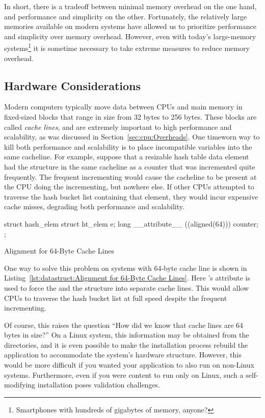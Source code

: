 In short, there is a tradeoff between minimal memory overhead on
the one hand, and performance and simplicity on the other.
Fortunately, the relatively large memories available on modern
systems have allowed us to prioritize performance and simplicity
over memory overhead.
However, even with today's large-memory systems\footnote{
	Smartphones with hundreds of gigabytes of memory, anyone?}
it is sometime necessary to take extreme measures to reduce
memory overhead.

\subsection{Hardware Considerations}
\label{sec:datastruct:Hardware Considerations}

Modern computers typically move data between CPUs and main memory in
fixed-sized blocks that range in size from 32 bytes to 256 bytes.
These blocks are called \emph{cache lines}, and are extremely important
to high performance and scalability, as was discussed in
Section~\ref{sec:cpu:Overheads}.
One timeworn way to kill both performance and scalability is to
place incompatible variables into the same cacheline.
For example, suppose that a resizable hash table data element had
the  structure in the same cacheline as a counter that
was incremented quite frequently.
The frequent incrementing would cause the cacheline to be present at
the CPU doing the incrementing, but nowhere else.
If other CPUs attempted to traverse the hash bucket list containing
that element, they would incur expensive cache misses, degrading both
performance and scalability.

\begin{listing}[tb]
\begin{VerbatimL}
struct hash_elem {
	struct ht_elem e;
	long __attribute__ ((aligned(64))) counter;
};
\end{VerbatimL}
\caption{Alignment for 64-Byte Cache Lines}
\label{lst:datastruct:Alignment for 64-Byte Cache Lines}
\end{listing}

One way to solve this problem on systems with 64-byte cache line is shown in
Listing~\ref{lst:datastruct:Alignment for 64-Byte Cache Lines}.
Here \GCC's  attribute is used to force the 
and the  structure into separate cache lines.
This would allow CPUs to traverse the hash bucket list at full speed
despite the frequent incrementing.

Of course, this raises the question ``How did we know that cache lines
are 64 bytes in size?''
On a Linux system, this information may be obtained from the
 directories, and it is even
possible to make the installation process rebuild the application to
accommodate the system's hardware structure.
However, this would be more difficult if you wanted your application to
also run on non-Linux systems.
Furthermore, even if you were content to run only on Linux, such a
self-modifying installation poses validation challenges.

